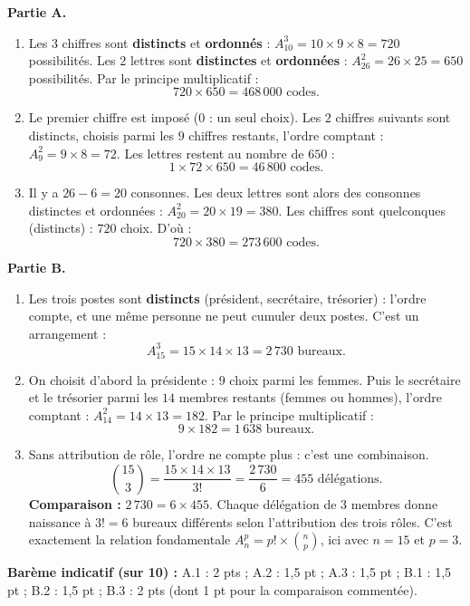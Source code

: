 \documentclass[11pt]{article}
\begin{document}
\begin{corrige}
\textbf{Partie A.}
\begin{enumerate}
\item Les $3$ chiffres sont \textbf{distincts} et \textbf{ordonnés} : $A_{10}^3=10\times9\times8=720$ possibilités. Les $2$ lettres sont \textbf{distinctes} et \textbf{ordonnées} : $A_{26}^2=26\times25=650$ possibilités. Par le principe multiplicatif :
\[ 720\times650=468\,000 \text{ codes.} \]
\item Le premier chiffre est imposé ($0$ : un seul choix). Les $2$ chiffres suivants sont distincts, choisis parmi les $9$ chiffres restants, l'ordre comptant : $A_9^2=9\times8=72$. Les lettres restent au nombre de $650$ :
\[ 1\times72\times650=46\,800 \text{ codes.} \]
\item Il y a $26-6=20$ consonnes. Les deux lettres sont alors des consonnes distinctes et ordonnées : $A_{20}^2=20\times19=380$. Les chiffres sont quelconques (distincts) : $720$ choix. D'où :
\[ 720\times380=273\,600 \text{ codes.} \]
\end{enumerate}
\textbf{Partie B.}
\begin{enumerate}
\item Les trois postes sont \textbf{distincts} (président, secrétaire, trésorier) : l'ordre compte, et une même personne ne peut cumuler deux postes. C'est un arrangement :
\[ A_{15}^3=15\times14\times13=2\,730 \text{ bureaux.} \]
\item On choisit d'abord la présidente : $9$ choix parmi les femmes. Puis le secrétaire et le trésorier parmi les $14$ membres restants (femmes ou hommes), l'ordre comptant : $A_{14}^2=14\times13=182$. Par le principe multiplicatif :
\[ 9\times182=1\,638 \text{ bureaux.} \]
\item Sans attribution de rôle, l'ordre ne compte plus : c'est une combinaison.
\[ \binom{15}{3}=\frac{15\times14\times13}{3!}=\frac{2\,730}{6}=455 \text{ délégations.} \]
\textbf{Comparaison :} $2\,730=6\times455$. Chaque délégation de $3$ membres donne naissance à $3!=6$ bureaux différents selon l'attribution des trois rôles. C'est exactement la relation fondamentale $A_n^p=p!\times\binom{n}{p}$, ici avec $n=15$ et $p=3$.
\end{enumerate}
\textbf{Barème indicatif (sur 10) :} A.1 : 2 pts ; A.2 : 1,5 pt ; A.3 : 1,5 pt ; B.1 : 1,5 pt ; B.2 : 1,5 pt ; B.3 : 2 pts (dont 1 pt pour la comparaison commentée).
\end{corrige}
\end{document}
